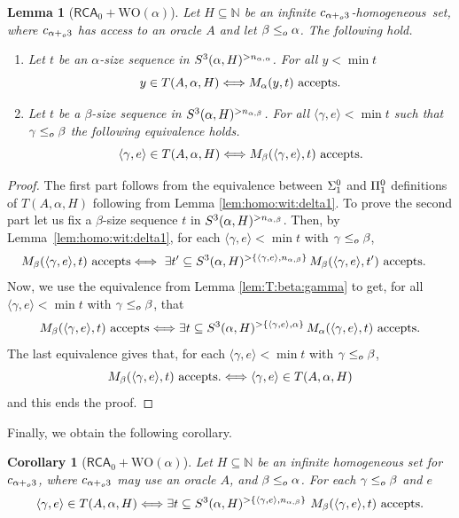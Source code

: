 \documentclass[11pt]{amsart}
\newtheorem{lemma}[thm]{Lemma}
\newtheorem{corollary}[thm]{Corollary}
\theoremstyle{definition}
\theoremstyle{remark}
\theoremstyle{plain}
\def\la{\langle}
\def\ra{\rangle}
\newcommand{\numberset}{\mathbb}
\newcommand{\N}{\numberset{N}}
\def\a{\alpha}
\def\b{\beta}
\newcommand{\RCA}{\mathsf{RCA}_0}
\newcommand{\set}[1]{{\{{#1}\}}}
\def\WO{{\textrm{WO}}}
\newcommand{\leqo}{\leq\sb{o}}
\newcommand{\pluso}{+\sb{o}}
\def\N{{\mathbb{N}}}
\newcommand{\homo}{homogeneous}
\def\ifff{\Longleftrightarrow}
\begin{document}
\begin{lemma}[$\RCA+\WO(\a)$]\label{lem:T:bounding}
Let $H\subseteq\N$ be an infinite $c\sb{\alpha \pluso3}$-\homo\ set, where $c\sb{\alpha\pluso3}$ has access to an oracle $A$ and let $\beta\leqo\alpha$. 
The following hold.
\begin{enumerate}
\item\label{3.20.1} Let $t$ be an $\a$-size sequence in $S\sp3(\alpha, H)\sp{> n_{\a,\a}}$.
For all $y<\min t$
$$
y\in T(A,\alpha,H) \ifff M\sb\alpha(y,t) \mbox{ accepts}.
$$
\item\label{3.20.2} Let $t$ be a $\beta$-size sequence in $S\sp3(\alpha, H)\sp{>n_{\a,\b}}$.
For all $\la \gamma,e \ra<\min t$ such that $\gamma\leqo\beta$ the following equivalence holds.
$$
\la \gamma,e \ra \in T(A,\alpha,H) \ifff M\sb\beta(\langle\gamma,e\rangle,t) \mbox{ accepts}.
$$
\end{enumerate}
\end{lemma}

\begin{proof}
The first part follows from the equivalence between $\Sigma\sp0\sb1$ and $\Pi\sp0\sb1$  definitions of $T(A,\alpha,H)$ following from Lemma \ref{lem:homo:wit:delta1}. 
To prove the second part let us fix a $\beta$-size sequence $t$ in $S\sp3(\alpha, H)^{> n_{\a,\b}}$. 
Then, by Lemma~\ref{lem:homo:wit:delta1}, for each $\langle\gamma,e\rangle<\min t$ with $\gamma\leqo\beta$, 
\begin{align*}
M\sb{\beta}(\langle\gamma,e\rangle,t)\mbox{ accepts} & \ifff \ \exists t' \subseteq S\sp 3(\alpha, H)\sp{> \set{\la \gamma, e\ra, n_{\a,\b}}}\, M\sb{\beta}(\la \gamma, e \ra,t')\mbox{ accepts.}
\end{align*}
Now, we use the equivalence from Lemma \ref{lem:T:beta:gamma} to get, for all $\la \gamma,e \ra < \min t$ with $\gamma \leqo \beta$, that
$$
M\sb\beta(\langle\gamma,e\rangle,t)\mbox{ accepts} \ifff \exists t \subseteq S\sp 3(\alpha,H)\sp{>\set{\langle\gamma,e\rangle,\alpha}}\, M\sb\alpha (\la \gamma, e\ra, t) \mbox{ accepts}.
$$
The last equivalence gives that, for each $\la \gamma, e \ra < \min t$ with $\gamma \leqo \beta$,
$$
M\sb\beta(\la \gamma,e \ra,t)\mbox{ accepts.}
\ifff \la\gamma,e\ra \in T(A,\alpha,H)  
$$
and this ends the proof.           
\end{proof}

Finally, we obtain the following corollary.

\begin{corollary}[$\RCA+\WO(\a)$]\label{cor:T:to:beta}
Let $H\subseteq\N$ be an infinite homogeneous set for $c\sb{\alpha \pluso3}$, where $c\sb{\alpha\pluso3}$ may use an oracle $A$, and $\beta\leqo\alpha$. 
For each $\gamma\leqo \beta$ and $e$
$$
\la\gamma,e\ra\in T(A,\alpha,H) \ifff \exists t\subseteq S\sp3(\alpha, H)\sp{> \set{\la \gamma,e \ra ,n_{\a,\b}}}\ M\sb\beta (\la \gamma,e \ra,t)\mbox{ accepts.}
$$
\end{corollary}
\end{document}
